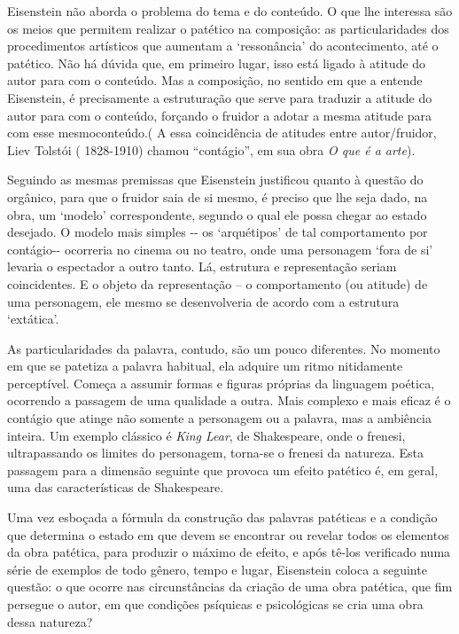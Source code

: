 Eisenstein não aborda o problema do tema e do conteúdo. O que lhe
interessa são os meios que permitem realizar o patético na composição:
as particularidades dos procedimentos artísticos que aumentam a
`ressonância' do acontecimento, até o patético. Não há dúvida que, em
primeiro lugar, isso está ligado à atitude do autor para com o conteúdo.
Mas a composição, no sentido em que a entende Eisenstein, é precisamente
a estruturação que serve para traduzir a atitude do autor para com o
conteúdo, forçando o fruidor a adotar a mesma atitude para com esse
mesmoconteúdo.( A essa coincidência de atitudes entre autor/fruidor,
Liev Tolstói ( 1828-1910) chamou ``contágio'', em sua obra \emph{O que é
a arte}).

Seguindo as mesmas premissas que Eisenstein justificou quanto à questão
do orgânico, para que o fruidor saia de si mesmo, é preciso que lhe seja
dado, na obra, um `modelo' correspondente, segundo o qual ele possa
chegar ao estado desejado. O modelo mais simples -\/- os `arquétipos' de
tal comportamento por contágio-\/- ocorreria no cinema ou no teatro,
onde uma personagem `fora de si' levaria o espectador a outro tanto. Lá,
estrutura e representação seriam coincidentes. E o objeto da
representação -- o comportamento (ou atitude) de uma personagem, ele
mesmo se desenvolveria de acordo com a estrutura `extática'.

As particularidades da palavra, contudo, são um pouco diferentes. No
momento em que se patetiza a palavra habitual, ela adquire um ritmo
nitidamente perceptível. Começa a assumir formas e figuras próprias da
linguagem poética, ocorrendo a passagem de uma qualidade a outra. Mais
complexo e mais eficaz é o contágio que atinge não somente a personagem
ou a palavra, mas a ambiência inteira. Um exemplo clássico é \emph{King
Lear}, de Shakespeare, onde o frenesi, ultrapassando os limites do
personagem, torna-se o frenesi da natureza. Esta passagem para a
dimensão seguinte que provoca um efeito patético é, em geral, uma das
características de Shakespeare.

Uma vez esboçada a fórmula da construção das palavras patéticas e a
condição que determina o estado em que devem se encontrar ou revelar
todos os elementos da obra patética, para produzir o máximo de efeito, e
após tê-los verificado numa série de exemplos de todo gênero, tempo e
lugar, Eisenstein coloca a seguinte questão: o que ocorre nas
circunstâncias da criação de uma obra patética, que fim persegue o
autor, em que condições psíquicas e psicológicas se cria uma obra dessa
natureza?

